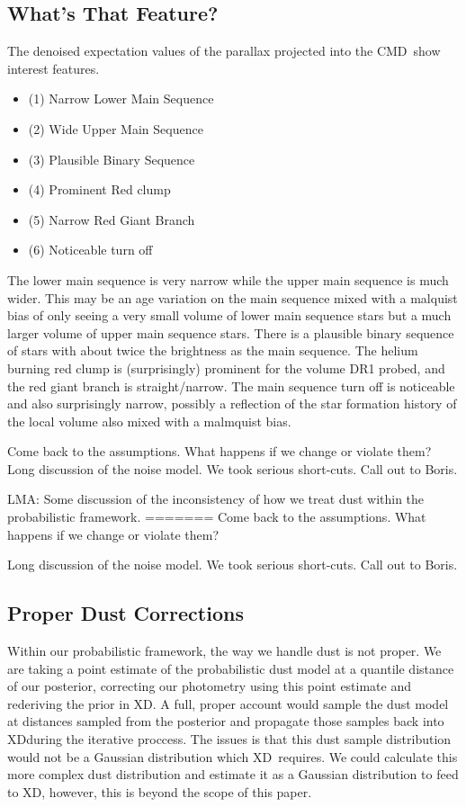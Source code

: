 \documentclass[modern]{aastex61}
\newcommand{\acronym}[1]{{\small{#1}}}
\newcommand{\xd}{\acronym{XD}}
\newcommand{\cmd}{\acronym{CMD}}
\begin{document}
\subsection{What's That Feature?}
The denoised expectation values of the parallax projected into the \cmd\ show interest features.
\begin{itemize}
\item (1) Narrow Lower Main Sequence
\item (2) Wide Upper Main Sequence
\item (3) Plausible Binary Sequence
\item (4) Prominent Red clump
\item (5) Narrow Red Giant Branch
\item (6) Noticeable turn off
\end{itemize}
The lower main sequence is very narrow while the upper main sequence is much wider. This may be an age variation on the main sequence mixed with a malquist bias of only seeing a very small volume of lower main sequence stars but a much larger volume of upper main sequence stars. There is a plausible binary sequence of stars with about twice the brightness as the main sequence. The helium burning red clump is (surprisingly) prominent for the volume DR1 probed, and the red giant branch is straight/narrow. The main sequence turn off is noticeable and also surprisingly narrow, possibly a reflection of the star formation history of the local volume also mixed with a malmquist bias.

Come back to the assumptions. What happens if we change or violate them? Long discussion of the noise model. We took serious short-cuts. Call out to Boris.


LMA: Some discussion of the inconsistency of how we treat dust within the probabilistic framework.
=======
Come back to the assumptions. What happens if we change or violate them?

Long discussion of the noise model. We took serious short-cuts. Call out to Boris.

\subsection{Proper Dust Corrections}
Within our probabilistic framework, the way we handle dust is not proper. We are taking a point estimate of the probabilistic dust model at a quantile distance of our posterior, correcting our photometry using this point estimate and rederiving the prior in \xd. A full, proper account would sample the dust model at distances sampled from the posterior and propagate those samples back into \xd during the iterative proccess. The issues is that this dust sample distribution would not be a Gaussian distribution which \xd\ requires. We could calculate this more complex dust distribution and estimate it as a Gaussian distribution to feed to \xd, however, this is beyond the scope of this paper.
\end{document}
